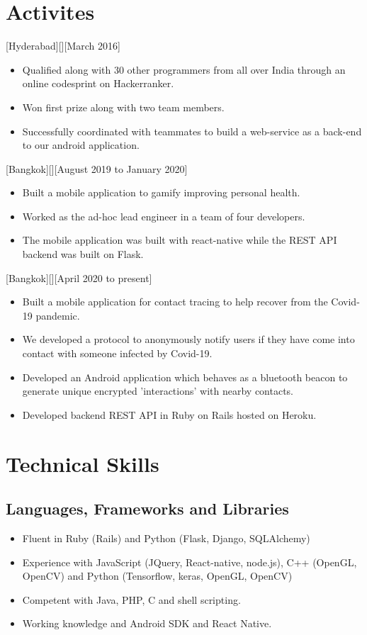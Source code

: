 \documentclass{article}
\begin{document}
\section{Activites}

[Hyderabad][][March 2016]
\begin{itemize}
    \item Qualified along with 30 other programmers from all over India through an online codesprint on Hackerranker.
    \item Won first prize along with two team members.
    \item Successfully coordinated with teammates to build a web-service as a back-end to our android application.
\end{itemize}

[Bangkok][][August 2019 to January 2020]
\begin{itemize}
    \item Built a mobile application to gamify improving personal health.
    \item Worked as the ad-hoc lead engineer in a team of four developers.
    \item The mobile application was built with react-native while the REST API backend was built on Flask.
\end{itemize}

[Bangkok][][April 2020 to present]
\begin{itemize}
    \item Built a mobile application for contact tracing to help recover from the Covid-19 pandemic.
    \item We developed a protocol to anonymously notify users if they have come into contact with someone infected by Covid-19.
    \item Developed an Android application which behaves as a bluetooth beacon to generate unique encrypted 'interactions' with nearby contacts.
    \item Developed backend REST API in Ruby on Rails hosted on Heroku.
\end{itemize}

\section{Technical Skills}
\subsection{Languages, Frameworks and Libraries}
\begin{itemize}
    \item Fluent in Ruby (Rails) and Python (Flask, Django, SQLAlchemy)
    \item Experience with JavaScript (JQuery, React-native, node.js), C++ (OpenGL, OpenCV) and Python (Tensorflow, keras, OpenGL, OpenCV)
    \item Competent with Java, PHP, C and shell scripting.
    \item Working knowledge and Android SDK and React Native.
\end{itemize}
\end{document}
